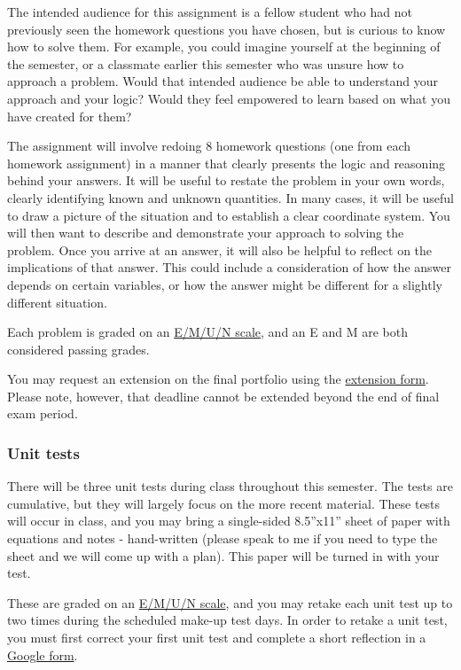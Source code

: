 \documentclass[
  letterpaper,
  DIV=11,
  numbers=noendperiod]{scrartcl}
\begin{document}
The intended audience for this assignment is a fellow student who had
not previously seen the homework questions you have chosen, but is
curious to know how to solve them. For example, you could imagine
yourself at the beginning of the semester, or a classmate earlier this
semester who was unsure how to approach a problem. Would that intended
audience be able to understand your approach and your logic? Would they
feel empowered to learn based on what you have created for them?

The assignment will involve redoing 8 homework questions (one from each
homework assignment) in a manner that clearly presents the logic and
reasoning behind your answers. It will be useful to restate the problem
in your own words, clearly identifying known and unknown quantities. In
many cases, it will be useful to draw a picture of the situation and to
establish a clear coordinate system. You will then want to describe and
demonstrate your approach to solving the problem. Once you arrive at an
answer, it will also be helpful to reflect on the implications of that
answer. This could include a consideration of how the answer depends on
certain variables, or how the answer might be different for a slightly
different situation.

Each problem is graded on an \hyperref[emun]{E/M/U/N scale}, and an E
and M are both considered passing grades.

You may request an extension on the final portfolio using the
\href{https://forms.gle/eFx7y7FoSdoukKGC6}{extension form}. Please note,
however, that deadline cannot be extended beyond the end of final exam
period.

\subsubsection{Unit tests}

There will be three unit tests during class throughout this semester.
The tests are cumulative, but they will largely focus on the more recent
material. These tests will occur in class, and you may bring a
single-sided 8.5''x11'' sheet of paper with equations and notes -
hand-written (please speak to me if you need to type the sheet and we
will come up with a plan). This paper will be turned in with your test.

These are graded on an \hyperref[emun]{E/M/U/N scale}, and you may
retake each unit test up to two times during the scheduled make-up test
days. In order to retake a unit test, you must first correct your first
unit test and complete a short reflection in a
\href{https://forms.gle/rfhtp2ALtBY8JFGT9}{Google form}.
\end{document}
